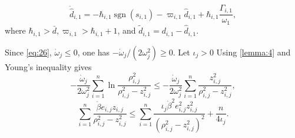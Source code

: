 \documentclass[pdflatex,sn-mathphys-num]{sn-jnl}%
\theoremstyle{thmstyleone}%
\theoremstyle{thmstyletwo}%
\theoremstyle{thmstylethree}%
\begin{document}
 
\begin{equation}\label{eq:32}
      \dot{\hat d}_{i,1} = -\hbar_{i,1} \operatorname{sgn}(s_{i,1})-\varpi_{i,1} {\hat d}_{i,1}+\hbar_{i,1}\frac{\varGamma_{i,1}}{{\omega}_{1}},
\end{equation}
where $\hbar_{i,1} >\bar{d}, \varpi_{i,1}>\hbar_{i,1}+1$, and $\tilde{d}_{i,1} = d_{i,1} - \hat{d}_{i,1}$.

Since \cref{eq:26}, $\dot{\omega}_{j} \leq 0$, one has $-\dot{\omega}_{j}/(2 \omega_{j}^{2}) \geq 0$. Let $\iota_j>0$ Using \cref{lemma:4} and Young's inequality gives
		\begin{equation}\label{eq:33}
-\frac{\dot{\omega}_{j}}{2 \omega_{j}^{2}}\sum_{i=1}^{n}\ln\frac{\rho_{i,j}^{2}}{\rho_{i,j}^{2}-z_{i,j}^{2}}
\leq -\frac{\dot{\omega}_{j}}{2 \omega_{j}^{2}}\sum_{i=1}^{n}\frac{z_{i,j}^{2}}{\rho_{i,j}^{2}-z_{i,j}^{2}},
	\end{equation}
		\begin{equation}\label{eq:34}
			\sum_{i=1}^{n} \frac{\dot{\beta} e_{i,j} z_{i,j}}{\rho_{i,j}^{2} - z_{i,j}^{2}} 
			\leq 
			 \sum_{i=1}^{n} \frac{\iota_j  \dot{\beta}^{2} e_{i,j}^{2} z_{i,j}^{2}}{(\rho_{i,j}^{2} - z_{i,j}^{2})^{2}} 
			+ \frac{n}{4\iota_j}.
			\end{equation}
			
\end{document}
